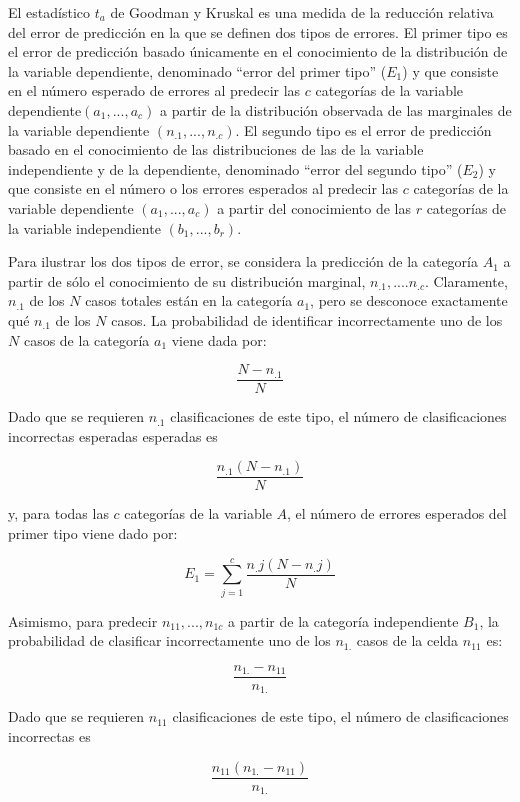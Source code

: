 \documentclass[12pt,a4paper,]{book}
\numberwithin{dummy}{section}
\theoremstyle{ocrenumbox}
\theoremstyle{blacknumex}
\theoremstyle{blacknumbox}
\theoremstyle{ocrenum}
\theoremstyle{ocrenum}
\begin{document}
El estadístico \(t_a\) de Goodman y Kruskal es una medida de la
reducción relativa del error de predicción en la que se definen dos
tipos de errores. El primer tipo es el error de predicción basado
únicamente en el conocimiento de la distribución de la variable
dependiente, denominado ``error del primer tipo'' (\(E_1\)) y que
consiste en el número esperado de errores al predecir las \(c\)
categorías de la variable dependiente\((a_1, . . . , a_c)\) a partir de
la distribución observada de las marginales de la variable dependiente
\((n_{.1}, . . . , n_{.c})\). El segundo tipo es el error de predicción
basado en el conocimiento de las distribuciones de las de la variable
independiente y de la dependiente, denominado ``error del segundo tipo''
(\(E_2\)) y que consiste en el número o los errores esperados al
predecir las \(c\) categorías de la variable dependiente
\((a_1, . . . , a_c)\) a partir del conocimiento de las \(r\) categorías
de la variable independiente \((b_1, . . . , b_r)\).

Para ilustrar los dos tipos de error, se considera la predicción de la
categoría \(A_1\) a partir de sólo el conocimiento de su distribución
marginal, \(n_{.1}, . . . . n_{.c}\). Claramente, \(n_{.1}\) de los
\(N\) casos totales están en la categoría \(a_1\), pero se desconoce
exactamente qué \(n_{.1}\) de los \(N\) casos. La probabilidad de
identificar incorrectamente uno de los \(N\) casos de la categoría
\(a_1\) viene dada por:

\[
\frac{N-n_{.1}}{N}
\]

Dado que se requieren \(n_{.1}\) clasificaciones de este tipo, el número
de clasificaciones incorrectas esperadas esperadas es

\[
\frac{n_.1(N-n_.1)}{N}
\]

y, para todas las \(c\) categorías de la variable \(A\), el número de
errores esperados del primer tipo viene dado por:

\[
E_1=\sum_{j=1}^c\frac{n_.j(N-n_.j)}{N}
\]

Asimismo, para predecir \(n_{11}, . . . , n_{1c}\) a partir de la
categoría independiente \(B_1\), la probabilidad de clasificar
incorrectamente uno de los \(n_{1.}\) casos de la celda \(n_{11}\) es:

\[
\frac{n_{1.}-n_{11}}{n_{1.}}
\]

Dado que se requieren \(n_{11}\) clasificaciones de este tipo, el número
de clasificaciones incorrectas es

\[
\frac{n_{11}(n_{1.}-n_{11})}{n_{1.}}
\]
\end{document}
